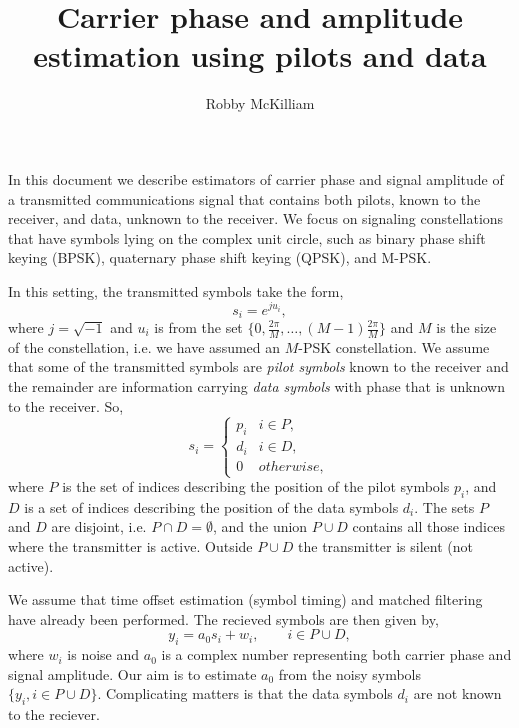 \documentclass[a4paper,10pt]{article}
\title{Carrier phase and amplitude estimation using pilots and data}
\author{Robby McKilliam}
\begin{document}
\maketitle

In this document we describe estimators of carrier phase and signal amplitude of a transmitted communications signal that contains both pilots, known to the receiver, and data, unknown to the receiver.  We focus on signaling constellations that have symbols lying on the complex unit circle, such as binary phase shift keying (BPSK), quaternary phase shift keying (QPSK), and M-PSK.  

In this setting, the transmitted symbols take the form,
\[
s_i = e^{j u_i},
\]
where $j = \sqrt{-1}$ and $u_i$ is from the set $\{0, \tfrac{2\pi}{M}, \dots, (M-1)\tfrac{2\pi}{M}\}$ and $M$ is the size of the constellation, i.e. we have assumed an $M$-PSK constellation.  We assume that some of the transmitted symbols are \emph{pilot symbols} known to the receiver and the remainder are information carrying \emph{data symbols} with phase that is unknown to the receiver.  So,
\[
s_i = \begin{cases}
p_i & i \in P, \\
d_i & i \in D, \\
0 & otherwise,
\end{cases}
\]
where $P$ is the set of indices describing the position of the pilot symbols $p_i$, and $D$ is a set of indices describing the position of the data symbols $d_i$.  The sets $P$ and $D$ are disjoint, i.e. $P \cap D = \emptyset$, and the union $P \cup D$ contains all those indices where the transmitter is active.  Outside $P \cup D$ the transmitter is silent (not active).  

We assume that time offset estimation (symbol timing) and matched filtering have already been performed.  The recieved symbols are then given by,
\begin{equation}\label{eq:sigmod}
y_i = a_0 s_i + w_i, \qquad i \in P \cup D,
\end{equation}
where $w_i$ is noise and $a_0$ is a complex number representing both carrier phase and signal amplitude.  Our aim is to estimate $a_0$ from the noisy symbols $\{ y_i, i \in P \cup D \}$.  Complicating matters is that the data symbols $d_i$ are not known to the reciever.  
\end{document}
